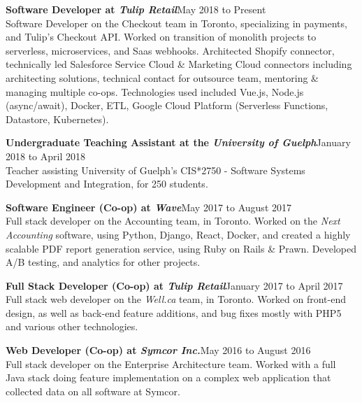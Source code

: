 \documentclass[9pt]{extarticle}
\begin{document}
{    \textbf{{\firamedium Software Developer at \textit{Tulip Retail}}}{\color{darkgrey}\hfill{\small{May 2018 to Present\\[5pt]}}
        Software Developer on the Checkout team in Toronto, specializing in payments, and Tulip's Checkout API. Worked on transition of monolith projects to serverless, microservices, and Saas webhooks. Architected Shopify connector, technically led Salesforce Service Cloud \& Marketing Cloud connectors including architecting solutions, technical contact for outsource team, mentoring \& managing multiple co-ops. Technologies used included Vue.js, Node.js (async/await), Docker, ETL, Google Cloud Platform (Serverless Functions, Datastore, Kubernetes).\\[-8pt]
    }

    \textbf{{\firamedium Undergraduate Teaching Assistant at the \textit{University of Guelph}}}{\color{darkgrey}\hfill{\small{January 2018 to April 2018\\[5pt]}}
        Teacher assisting University of Guelph's CIS*2750 - Software Systems Development and Integration, for 250 students.\\[-8pt]
    }

    \textbf{{\firamedium Software Engineer (Co-op) at \textit{Wave}}}{\color{darkgrey}\hfill{\small{May 2017 to August 2017\\[5pt]}}
        Full stack developer on the Accounting team, in Toronto. Worked on the \textit{Next Accounting} software, using Python, Django, React, Docker, and created a highly scalable PDF report generation service, using Ruby on Rails \& Prawn. Developed A/B testing, and analytics for other projects.\\[-8pt]
    }

    \textbf{{\firamedium Full Stack Developer (Co-op) at \textit{Tulip Retail}}}{\color{darkgrey}\hfill{\small{January 2017 to April 2017\\[5pt]}}
        Full stack web developer on the \textit{Well.ca} team, in Toronto. Worked on front-end design, as well as back-end feature additions, and bug fixes mostly with PHP5 and various other technologies. \\[-8pt]
    }

    \textbf{{\firamedium Web Developer (Co-op) at \textit{Symcor Inc.}}}{\color{darkgrey}\hfill{\small{May 2016 to August 2016\\[5pt]}}
        Full stack developer on the Enterprise Architecture team. Worked with a full Java stack doing feature implementation on a complex web application that collected data on all software at Symcor. \\
    }

}
\end{document}
